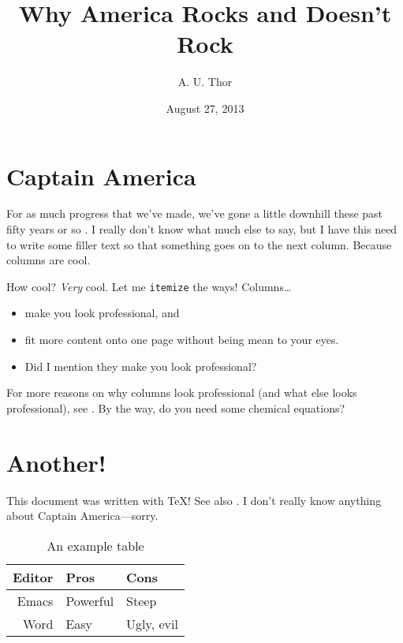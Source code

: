 \documentclass{psypaper}
\title{Why America Rocks and Doesn't Rock}
\author{A. U. Thor}
\date{August 27, 2013}
\begin{document}
\maketitle

\section{Captain America}
For as much progress that we've made,
  we've gone a little downhill
  these past fifty years or so \autocite{rogers:elements}.
I really don't know what much else to say,
  but I have this need to write some filler text
  so that something goes on to the next column.
Because columns are cool.

How cool?
\emph{Very} cool.
Let me \texttt{itemize} the ways!
Columns\dots
\begin{itemize}
\item make you look professional, and
\item fit more content onto one page without being mean to your eyes.
\item Did I mention they make you look professional?
\end{itemize}

For more reasons on why columns look professional
  (and what else looks professional),
  see \cite{compandtype}.
By the way, do you need some chemical equations?


\section{Another!}
This document was written with \TeX! See also \cite{texbook}.
I don't really know anything about Captain America---sorry.

\begin{table}
  \centering
  \begin{tabular}{rll}
    \toprule
    Editor & Pros & Cons \\
    \midrule
    Emacs & Powerful & Steep \\
    Word  & Easy & Ugly, evil \\
    \bottomrule
  \end{tabular}
  \caption{An example table}
  \label{tab:ex}
\end{table}

\printbibliography
\end{document}
